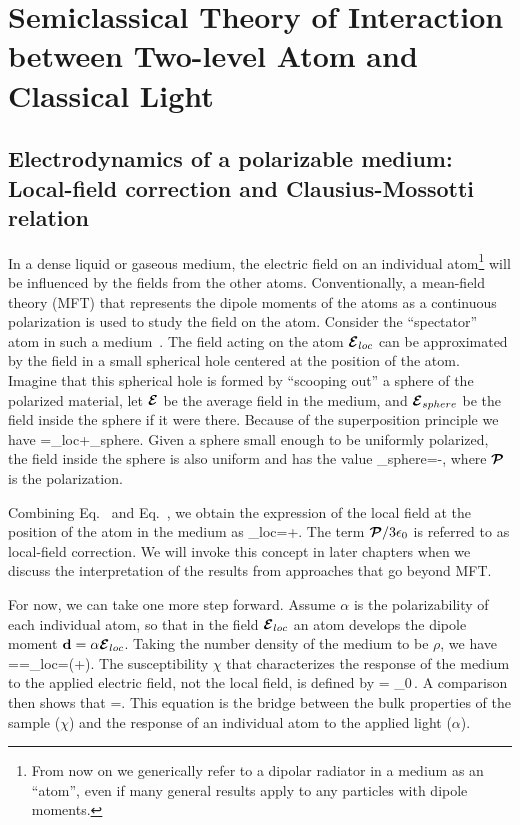 \chapter{Semiclassical Theory of Interaction between Two-level Atom and Classical Light}

\section{Electrodynamics of a polarizable medium: Local-field correction and Clausius-Mossotti relation}
\label{LFC}

In a dense liquid or gaseous medium, the electric field on an individual atom\footnote{From now on we generically refer to a dipolar radiator in a medium as an ``atom'', even if many general results apply to any particles with dipole moments.} will be influenced by the fields from the other atoms. Conventionally, a mean-field theory (MFT) that represents the dipole moments of the atoms as a continuous polarization is used to study the field on the atom.  Consider the ``spectator'' atom in such a medium~\cite{feynman}. The field acting on the atom $\cbE_{loc}$ can be approximated by the field in a small spherical hole centered at the position of the atom. Imagine that this spherical hole is formed by ``scooping out'' a sphere of the polarized material, let $\cbE$ be the average field in the medium, and $\cbE_{sphere}$ be the field inside the sphere if it were there. Because of the superposition principle we have
\bea
\cbE=\cbE_{loc}+\cbE_{sphere}.
\label{E_MEAN}
\eea
Given a sphere small enough to be uniformly polarized,  the field inside the sphere is also uniform and has the value
\bea
\cbE_{sphere}=-,
\label{E_SPHERE}
\eea
where  $\cbP$ is the polarization.

Combining Eq.~ and Eq.~, we obtain the expression of the local field at the position of the atom in the medium as
\bea
\cbE_{loc}=\cbE+.
\label{LOCAL_FIELD}
\eea
The term $\cbP/3\epsilon_0$  is referred to as local-field correction. We will invoke this concept in later chapters when we discuss the interpretation of the results from approaches that go beyond MFT.

For now, we can take one more step forward. Assume $\alpha$ is the polarizability of each individual atom, so that in the field $\cbE_{loc}$ an atom develops the dipole moment $\bd = \alpha \cbE_{loc}$.  Taking the number density of the medium to be $\rho$, we have
\bea
{\cbP}=\rho\bd=\rho\alpha\cbE_{loc}=\rho\alpha\left(\cbE+\right).
\label{POLARIZATION}
\eea
The susceptibility $\chi$ that characterizes the response of the medium to the applied electric field, not the local field, is defined by
\beq
{\cbP} = \epsilon_0\chi \cbE\,.
\eeq
A comparison then shows that
\bea
\chi=.
\label{LLLAW}
\eea
This equation is the bridge between the bulk properties of the sample ($\chi$) and the response of an individual atom to the applied light ($\alpha$). 

